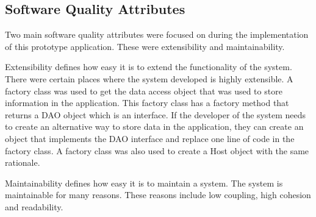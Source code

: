 \tocless\subsection{Software Quality Attributes}
Two main software quality attributes were focused on during the implementation of this prototype application. These were extensibility and maintainability.

Extensibility defines how easy it is to extend the functionality of the system.
There were certain places where the system developed is highly extensible.
A factory class was used to get the data access object that was used to store information in the application.
This factory class has a factory method that returns a DAO object which is an interface.
If the developer of the system needs to create an alternative way to store data in the application, they can create an object that implements the DAO interface and replace one line of code in the factory class.
A factory class was also used to create a Host object with the same rationale.

Maintainability defines how easy it is to maintain a system.
The system is maintainable for many reasons.
These reasons include low coupling, high cohesion and readability.




